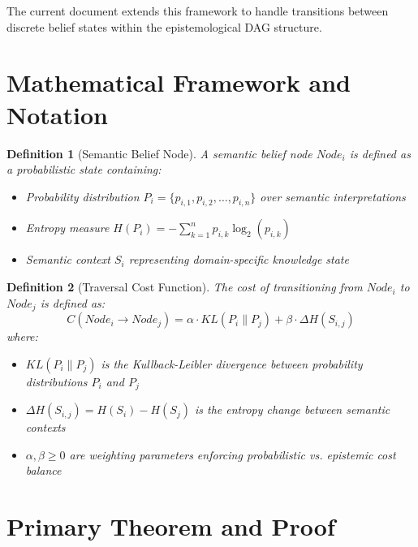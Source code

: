 \documentclass[11pt,a4paper]{article}
\newtheorem{definition}{Definition}
\begin{document}
The current document extends this framework to handle transitions between discrete belief states within the epistemological DAG structure.

\section{Mathematical Framework and Notation}

\begin{definition}[Semantic Belief Node]
A semantic belief node $Node_i$ is defined as a probabilistic state containing:
\begin{itemize}
    \item Probability distribution $P_i = \{p_{i,1}, p_{i,2}, \ldots, p_{i,n}\}$ over semantic interpretations
    \item Entropy measure $H(P_i) = -\sum_{k=1}^{n} p_{i,k} \log_2(p_{i,k})$
    \item Semantic context $S_i$ representing domain-specific knowledge state
\end{itemize}
\end{definition}

\begin{definition}[Traversal Cost Function]
The cost of transitioning from $Node_i$ to $Node_j$ is defined as:
\begin{equation}
C(Node_i \rightarrow Node_j) = \alpha \cdot KL(P_i \parallel P_j) + \beta \cdot \Delta H(S_{i,j})
\end{equation}
where:
\begin{itemize}
    \item $KL(P_i \parallel P_j)$ is the Kullback-Leibler divergence between probability distributions $P_i$ and $P_j$
    \item $\Delta H(S_{i,j}) = H(S_i) - H(S_j)$ is the entropy change between semantic contexts
    \item $\alpha, \beta \geq 0$ are weighting parameters enforcing probabilistic vs. epistemic cost balance
\end{itemize}
\end{definition}

\section{Primary Theorem and Proof}
\end{document}
